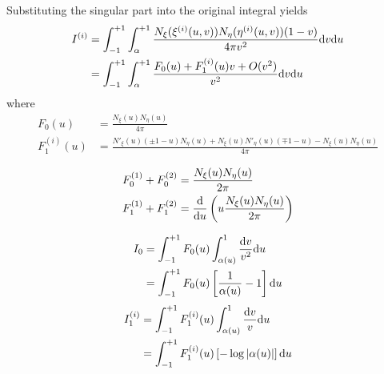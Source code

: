 Substituting the singular part into the original integral yields
%
\begin{align}
	I^{(i)}
	&= \int_{-1}^{+1}
	\int_{\alpha}^{+1}
	\frac{	N_{\xi}(\xi^{(i)}(u,v))
	N_{\eta}(\eta^{(i)}(u,v))
	(1-v)
	}{4\pi v^2}
	\mathrm{d} v
	\mathrm{d} u \\
	&= \int_{-1}^{+1}
	\int_{\alpha}^{+1}
	\frac{F_0(u) + F_1^{(i)}(u) v + O(v^2)}{v^2}
	\mathrm{d} v
	\mathrm{d} u
\end{align}
%
where
%
\begin{align}
	F_0(u) &= \frac{N_{\xi}(u) N_{\eta}(u)}{4\pi} \\
	F_1^{(i)}(u) &= \frac{N'_{\xi}(u) (\pm 1-u) N_{\eta}(u) + N_{\xi}(u) N'_{\eta}(u) (\mp 1-u) - N_{\xi}(u) N_{\eta}(u)}{4\pi}
\end{align}


\begin{align}
	F_0^{(1)} + F_0^{(2)} &= \frac{N_{\xi}(u) N_{\eta}(u)}{2\pi} \\
	F_1^{(1)} + F_1^{(2)} &= \frac{\mathrm{d}}{\mathrm{d} u} \left( u \frac{N_{\xi}(u) N_{\eta}(u)}{2\pi}\right)
\end{align}

%
\begin{align}
	I_0 &= \int_{-1}^{+1} F_0(u) \int_{\alpha(u)}^{1} \frac{\mathrm{d} v}{v^2} \mathrm{d} u \\
	&= \int_{-1}^{+1} F_0(u) \left[  \frac{1}{\alpha(u)} - 1  \right] \mathrm{d} u
\end{align}
%
\begin{align}
	I^{(i)}_1 &= \int_{-1}^{+1} F^{(i)}_1(u) \int_{\alpha(u)}^{1} \frac{\mathrm{d} v}{v} \mathrm{d} u \\
	&= \int_{-1}^{+1} F^{(i)}_1(u) \left[ -\log|\alpha(u)| \right] \mathrm{d} u
\end{align}
